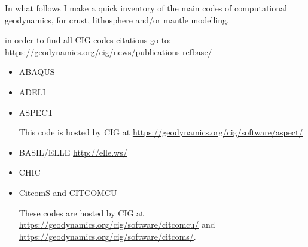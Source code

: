 
In what follows I make a quick inventory of the main codes of computational geodynamics, 
for crust, lithosphere and/or mantle modelling.

in order to find all CIG-codes citations go to: https://geodynamics.org/cig/news/publications-refbase/

\begin{itemize}

\item ABAQUS
\cite{gedh02}
\cite{kuhe09}
\cite{makh09}
\cite{nalr12}
\cite{pevp15}


\item ADELI
\cite{hajc97}
\cite{vech06} 
\cite{boht08a}
\cite{boht08b}
\cite{gech12}
\cite{gigh12}
\cite{wahd13}
\cite{ceag15}
\cite{cegm18}

\item ASPECT

This code is hosted by CIG at \url{https://geodynamics.org/cig/software/aspect/}

\cite{bahk07}
\cite{krhb12}
\cite{aupm15}
\cite{tosn15}
\cite{dahe16}
\cite{gadb16}
\cite{zhon16}
\cite{hepb17}
\cite{daef17}
\cite{hedg17}
\cite{robh17}
\cite{robu17}
\cite{aumh17}
\cite{thie17}
\cite{brsg17}
\cite{onmz17}
\cite{tasm17}
\cite{zhli17}
\cite{daga18}
\cite{onzh18}
\cite{gltf18}
\cite{heps18}
\cite{galh18}
\cite{peka18}
\cite{puth18}
\cite{brst18b}
\cite{baba19}
\cite{stbl19}
\cite{cocf19}
\cite{liki19}

\item BASIL/ELLE \url{http://elle.ws/}
\cite{bokj08}
\cite{llor19}

\item CHIC 
\cite{norv15}

\item CitcomS and CITCOMCU

These codes are hosted by CIG at \url{https://geodynamics.org/cig/software/citcomcu/}
and \url{https://geodynamics.org/cig/software/citcoms/}.


\end{itemize}

